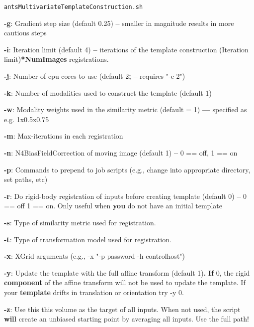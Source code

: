 \documentclass[ignorenonframetext,]{beamer}
\newenvironment{Shaded}{\begin{snugshade}}{\end{snugshade}}
\newcommand{\KeywordTok}[1]{\textcolor[rgb]{0.13,0.29,0.53}{\textbf{{#1}}}}
\newcommand{\StringTok}[1]{\textcolor[rgb]{0.31,0.60,0.02}{{#1}}}
\newcommand{\NormalTok}[1]{{#1}}
\begin{document}
\begin{frame}[fragile]{\texttt{antsMultivariateTemplateConstruction.sh}}
\begin{Shaded}
\begin{Highlighting}[]
     \KeywordTok{-g}\NormalTok{:  Gradient step size (default 0.25) }\KeywordTok{--} \NormalTok{smaller in magnitude results in more cautious steps}

     \KeywordTok{-i}\NormalTok{:  Iteration limit (default 4) }\KeywordTok{--} \NormalTok{iterations of the template construction (Iteration limit)}\KeywordTok{*NumImages} \NormalTok{registrations.}

     \KeywordTok{-j}\NormalTok{:  Number of cpu cores to use (default 2}\KeywordTok{;} \KeywordTok{--} \NormalTok{requires }\StringTok{"-c 2"}\NormalTok{)}

     \KeywordTok{-k}\NormalTok{:  Number of modalities used to construct the template (default 1)}

     \KeywordTok{-w}\NormalTok{:  Modality weights used in the similarity metric (default = 1) }\KeywordTok{---} \NormalTok{specified as e.g. 1x0.5x0.75}

     \KeywordTok{-m}\NormalTok{:  Max-iterations in each registration}

     \KeywordTok{-n}\NormalTok{:  N4BiasFieldCorrection of moving image (default 1) }\KeywordTok{--} \NormalTok{0 == off, 1 == on}

     \KeywordTok{-p}\NormalTok{:  Commands to prepend to job scripts (e.g., change into appropriate directory, set paths, etc)}

     \KeywordTok{-r}\NormalTok{:  Do rigid-body registration of inputs before creating template (default 0) }\KeywordTok{--} \NormalTok{0 == off 1 == on. Only useful when}
          \KeywordTok{you} \NormalTok{do not have an initial template}

     \KeywordTok{-s}\NormalTok{:  Type of similarity metric used for registration.}

     \KeywordTok{-t}\NormalTok{:  Type of transformation model used for registration.}

     \KeywordTok{-x}\NormalTok{:  XGrid arguments (e.g., -x }\StringTok{"-p password -h controlhost"}\NormalTok{)}

     \KeywordTok{-y}\NormalTok{:  Update the template with the full affine transform (default 1)}\KeywordTok{.} \KeywordTok{If} \NormalTok{0, the rigid}
          \KeywordTok{component} \NormalTok{of the affine transform will not be used to update the template. If your}
          \KeywordTok{template} \NormalTok{drifts in translation or orientation try -y 0.}

     \KeywordTok{-z}\NormalTok{:  Use this this volume as the target of all inputs. When not used, the script}
          \KeywordTok{will} \NormalTok{create an unbiased starting point by averaging all inputs. Use the full path!}


\end{Highlighting}
\end{Shaded}
\end{frame}
\end{document}
